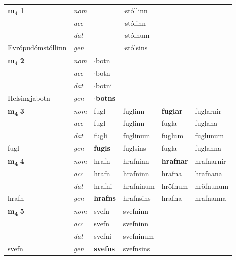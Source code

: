\begin{longtable}[l]{llllll}
\multirow{3}{*}{{{\textbf{m{\textsubscript{4}}} \Large{\textbf{1}}}}}  & {\footnotesize{{\textit{nom}}}} &  & $\cdot$stóllinn    & \textbf{} &   \\*
 &  {\footnotesize{{\textit{acc}}}} &   & $\cdot$stólinn   &   &  \\*
 &  {\footnotesize{{\textit{dat}}}} &  & $\cdot$stólnum   &  &  \\*
 {\footnotesize{Evrópudómstóllinn}} &   {\footnotesize{{\textit{gen}}}} & \textbf{}  & $\cdot$stólsins  &  &  \\
\cmidrule{1-6}


\multirow{3}{*}{{{\textbf{m{\textsubscript{4}}} \Large{\textbf{2}}}}}  & {\footnotesize{{\textit{nom}}}} & $\cdot$botn &     & \textbf{} &   \\*
 &  {\footnotesize{{\textit{acc}}}} & $\cdot$botn  &    &   &  \\*
 &  {\footnotesize{{\textit{dat}}}} & $\cdot$botni &    &  &  \\*
 {\footnotesize{Helsingjabotn}} &   {\footnotesize{{\textit{gen}}}} & \textbf{$\cdot$botns}  &   &  &  \\
\cmidrule{1-6}


\multirow{3}{*}{{{\textbf{m{\textsubscript{4}}} \Large{\textbf{3}}}}}  & {\footnotesize{{\textit{nom}}}} & fugl & fuglinn    & \textbf{fuglar} & fuglarnir  \\*
 &  {\footnotesize{{\textit{acc}}}} & fugl  & fuglinn   & fugla  & fuglana \\*
 &  {\footnotesize{{\textit{dat}}}} & fugli & fuglinum   & fuglum & fuglunum \\*
 {\footnotesize{fugl}} &   {\footnotesize{{\textit{gen}}}} & \textbf{fugls}  & fuglsins  & fugla & fuglanna \\
\cmidrule{1-6}


\multirow{3}{*}{{{\textbf{m{\textsubscript{4}}} \Large{\textbf{4}}}}}  & {\footnotesize{{\textit{nom}}}} & hrafn & hrafninn    & \textbf{hrafnar} & hrafnarnir  \\*
 &  {\footnotesize{{\textit{acc}}}} & hrafn  & hrafninn   & hrafna  & hrafnana \\*
 &  {\footnotesize{{\textit{dat}}}} & hrafni & hrafninum   & hröfnum & hröfnunum \\*
 {\footnotesize{hrafn}} &   {\footnotesize{{\textit{gen}}}} & \textbf{hrafns}  & hrafnsins  & hrafna & hrafnanna \\
\cmidrule{1-6}


\multirow{3}{*}{{{\textbf{m{\textsubscript{4}}} \Large{\textbf{5}}}}}  & {\footnotesize{{\textit{nom}}}} & svefn & svefninn    & \textbf{} &   \\*
 &  {\footnotesize{{\textit{acc}}}} & svefn  & svefninn   &   &  \\*
 &  {\footnotesize{{\textit{dat}}}} & svefni & svefninum   &  &  \\*
 {\footnotesize{svefn}} &   {\footnotesize{{\textit{gen}}}} & \textbf{svefns}  & svefnsins  &  &  \\
\cmidrule{1-6}



\end{longtable}
